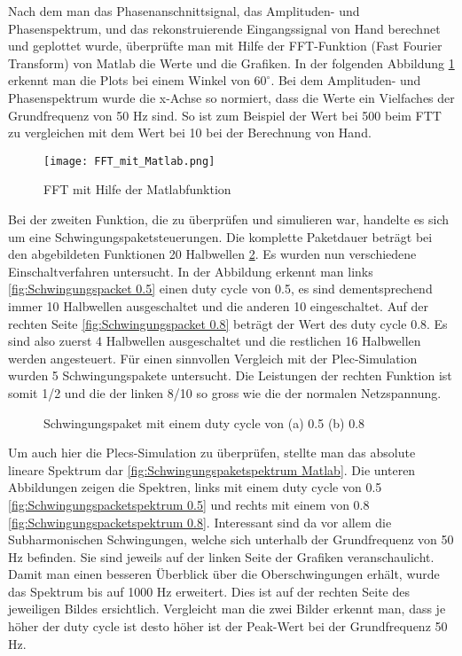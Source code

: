 Nach dem man das Phasenanschnittsignal, das Amplituden- und Phasenspektrum, und das rekonstruierende Eingangssignal von Hand berechnet und geplottet wurde, überprüfte man mit Hilfe der FFT-Funktion (Fast Fourier Transform) von Matlab die Werte und die Grafiken. In der folgenden Abbildung \ref{fig:FFT mit Matlab} erkennt man die Plots bei einem Winkel von $60^\circ$. Bei dem Amplituden- und Phasenspektrum wurde die x-Achse so normiert, dass die Werte ein Vielfaches der Grundfrequenz von 50 Hz sind. So ist zum Beispiel der Wert bei 500 beim FTT zu vergleichen mit dem Wert bei 10 bei der Berechnung von Hand.

\begin{figure}[ht!]
	\centering
	\texttt{[image: FFT\_mit\_Matlab.png]}	
	\caption{FFT mit Hilfe der Matlabfunktion}
	\label{fig:FFT mit Matlab}
\end{figure}

Bei der zweiten Funktion, die zu überprüfen und simulieren war, handelte es sich um eine Schwingungspaketsteuerungen. Die komplette Paketdauer beträgt bei den abgebildeten Funktionen 20 Halbwellen \ref{fig:Schwingungspaket Matlab}. Es wurden nun verschiedene Einschaltverfahren untersucht. In der Abbildung  erkennt man links \ref{fig:Schwingungspacket 0.5} einen duty cycle von 0.5, es sind dementsprechend immer 10 Halbwellen  ausgeschaltet und die anderen 10 eingeschaltet. Auf der rechten Seite \ref{fig:Schwingungspacket 0.8} beträgt der Wert des duty cycle 0.8. Es sind also zuerst 4 Halbwellen ausgeschaltet und die restlichen 16 Halbwellen werden angesteuert. Für einen sinnvollen Vergleich mit der Plec-Simulation wurden 5 Schwingungspakete untersucht. Die Leistungen der rechten Funktion ist somit 1/2 und die der linken 8/10 so gross wie die der normalen Netzspannung.

\begin{figure}[h]
	\centering
	\qquad
	\caption{Schwingungspaket mit einem duty cycle von (a) 0.5 (b) 0.8}
	\label{fig:Schwingungspaket Matlab}
\end{figure} 

Um auch hier die Plecs-Simulation zu überprüfen, stellte man das absolute lineare Spektrum dar \ref{fig:Schwingungspaketspektrum Matlab}. Die unteren  Abbildungen zeigen die Spektren, links mit einem duty cycle von 0.5 \ref{fig:Schwingungspacketspektrum 0.5} und rechts mit einem von 0.8 \ref{fig:Schwingungspacketspektrum 0.8}. Interessant sind da vor allem die Subharmonischen Schwingungen, welche sich unterhalb der Grundfrequenz von 50 Hz befinden. Sie sind jeweils auf der linken Seite der Grafiken veranschaulicht. Damit man einen besseren Überblick über die Oberschwingungen erhält, wurde das Spektrum bis auf 1000 Hz erweitert. Dies ist auf der rechten Seite des jeweiligen Bildes ersichtlich. Vergleicht man die zwei Bilder erkennt man, dass je höher der duty cycle ist desto höher ist der Peak-Wert bei der Grundfrequenz 50 Hz. 

